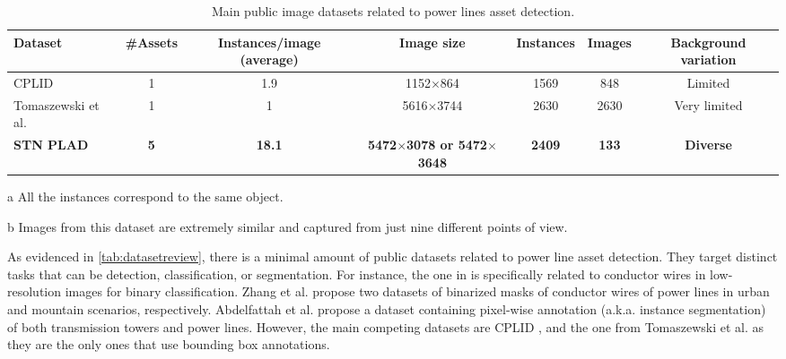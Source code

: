 \documentclass[10pt,conference]{IEEEtran}
\begin{document}
\begin{table*}[htbp]
 \caption{Main public image datasets related to power lines asset detection. }
 \centering
   \begin{threeparttable}
\begin{tabular}{lcccccc}
\toprule
Dataset                                                              & \#Assets                    & Instances/image (average)      & Image size                                                     & Instances & Images & Background variation              \\
\midrule
CPLID \cite{tao2018cplid}                           & 1                           & 1.9                            & 1152$\times$864                                                & 1569                          & 848                        & Limited                           \\
Tomaszewski et al. \cite{tomaszewski2018collection} & 1                           & 1                              & 5616$\times$3744                                               & 2630\tnote{a}                         & 2630\tnote{b}                      & Very limited                      \\
\textbf{STN PLAD}                                      & \textbf{5} & \textbf{18.1} & \textbf{5472$\times$3078 or 5472$\times$3648} & \textbf{2409}                          & \textbf{133}                        & \textbf{Diverse} \\ 
\bottomrule
\end{tabular}
  \begin{tablenotes}
  \item[a] All the instances correspond to the same object.
  \item[b] Images from this dataset are extremely similar and captured from just nine different points of view.
  \end{tablenotes}
  \end{threeparttable}
  \label{tab:datasetreview}
\end{table*}


As evidenced in \autoref{tab:datasetreview}, there is a minimal amount of public datasets related to power line asset detection. They target distinct tasks that can be detection, classification, or segmentation. For instance, the one in \cite{emre2017powerline} is specifically related to conductor wires in low-resolution images for binary classification. Zhang et al. \cite{zhang2019detecting} propose two datasets of binarized masks of conductor wires of power lines in urban and mountain scenarios, respectively. Abdelfattah et al. \cite{abdelfattah2020ttpla} propose a dataset containing pixel-wise annotation (a.k.a. instance segmentation) of both transmission towers and power lines. However, the main competing datasets are CPLID \cite{tao2018cplid}, and the one from Tomaszewski et al. \cite{tomaszewski2018collection} as they are the only ones that use bounding box annotations.
\end{document}
